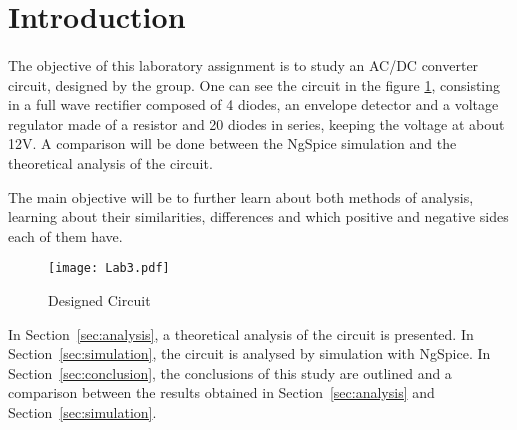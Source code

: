 \section{Introduction}
\label{sec:introduction}
\paragraph{}
\par The objective of this laboratory assignment is to study an AC/DC converter circuit, designed by the group. One can see the circuit in the figure \ref{Designed Circuit}, consisting in a full wave rectifier composed of 4 diodes, an envelope detector and a voltage regulator made of a resistor and 20 diodes in series, keeping the voltage at about 12V. A comparison will be done between the NgSpice simulation and the theoretical analysis of the circuit.
\par The main objective will be to further learn about both methods of analysis, learning about their similarities, differences and which positive and negative sides each of them have. 


\begin{figure}[H]
    \texttt{[image: Lab3.pdf]}
    \centering
    \caption{Designed Circuit}
    \label{Designed Circuit}
\end{figure}


In Section~\ref{sec:analysis}, a theoretical analysis of the circuit is
presented. In Section~\ref{sec:simulation}, the circuit is analysed by
simulation with NgSpice. In Section~\ref{sec:conclusion}, the conclusions of this study are outlined and a comparison between the results obtained in Section~\ref{sec:analysis} and Section~\ref{sec:simulation}.
